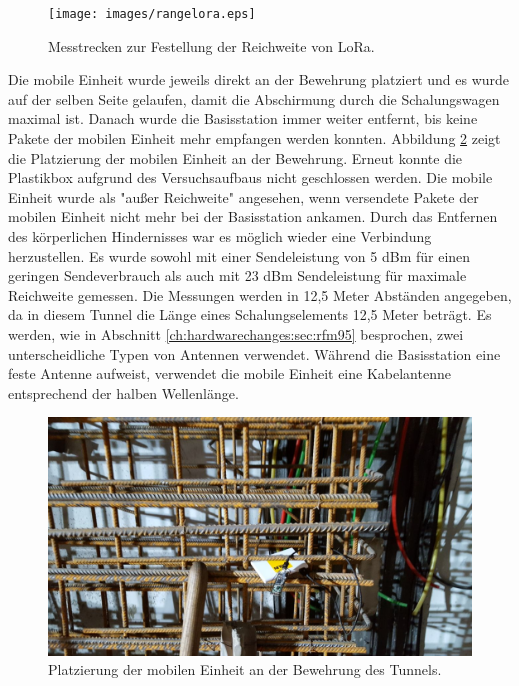 \begin{figure}[h!]
  \centering
	\texttt{[image: images/rangelora.eps]}
  \caption{Messtrecken zur Festellung der Reichweite von LoRa.}
  \label{fig:rangelora}
\end{figure}

Die mobile Einheit wurde jeweils direkt an der Bewehrung platziert und es wurde auf der selben Seite gelaufen, damit die Abschirmung durch die Schalungswagen maximal ist.
Danach wurde die Basisstation immer weiter entfernt, bis keine Pakete der mobilen Einheit mehr empfangen werden konnten.
Abbildung \ref{fig:lorabasis} zeigt die Platzierung der mobilen Einheit an der Bewehrung.
Erneut konnte die Plastikbox aufgrund des Versuchsaufbaus nicht geschlossen werden.
Die mobile Einheit wurde als "{}außer Reichweite"{} angesehen, wenn versendete Pakete der mobilen Einheit nicht mehr bei der Basisstation ankamen.
Durch das Entfernen des körperlichen Hindernisses war es möglich wieder eine Verbindung herzustellen.
Es wurde sowohl mit einer Sendeleistung von 5 dBm für einen geringen Sendeverbrauch als auch mit 23 dBm Sendeleistung für maximale Reichweite gemessen.
Die Messungen werden in 12,5 Meter Abständen angegeben, da in diesem Tunnel die Länge eines Schalungselements 12,5 Meter beträgt.
Es werden, wie in Abschnitt \ref{ch:hardwarechanges:sec:rfm95} besprochen, zwei unterscheidliche Typen von Antennen verwendet. 
Während die Basisstation eine feste Antenne aufweist, verwendet die mobile Einheit eine Kabelantenne entsprechend der halben Wellenlänge. 

\begin{figure}[h]
  \centering
	\includegraphics[width=\textwidth]{images/lorabasis.jpg}
  \caption{Platzierung der mobilen Einheit an der Bewehrung des Tunnels.}
  \label{fig:lorabasis}
\end{figure}


